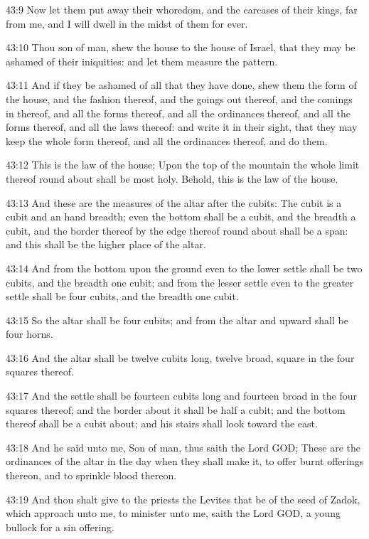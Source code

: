 43:9 Now let them put away their whoredom, and the carcases of their
kings, far from me, and I will dwell in the midst of them for ever.

43:10 Thou son of man, shew the house to the house of Israel, that
they may be ashamed of their iniquities: and let them measure the
pattern.

43:11 And if they be ashamed of all that they have done, shew them the
form of the house, and the fashion thereof, and the goings out
thereof, and the comings in thereof, and all the forms thereof, and
all the ordinances thereof, and all the forms thereof, and all the
laws thereof: and write it in their sight, that they may keep the
whole form thereof, and all the ordinances thereof, and do them.

43:12 This is the law of the house; Upon the top of the mountain the
whole limit thereof round about shall be most holy. Behold, this is
the law of the house.

43:13 And these are the measures of the altar after the cubits: The
cubit is a cubit and an hand breadth; even the bottom shall be a
cubit, and the breadth a cubit, and the border thereof by the edge
thereof round about shall be a span: and this shall be the higher
place of the altar.

43:14 And from the bottom upon the ground even to the lower settle
shall be two cubits, and the breadth one cubit; and from the lesser
settle even to the greater settle shall be four cubits, and the
breadth one cubit.

43:15 So the altar shall be four cubits; and from the altar and upward
shall be four horns.

43:16 And the altar shall be twelve cubits long, twelve broad, square
in the four squares thereof.

43:17 And the settle shall be fourteen cubits long and fourteen broad
in the four squares thereof; and the border about it shall be half a
cubit; and the bottom thereof shall be a cubit about; and his stairs
shall look toward the east.

43:18 And he said unto me, Son of man, thus saith the Lord GOD; These
are the ordinances of the altar in the day when they shall make it, to
offer burnt offerings thereon, and to sprinkle blood thereon.

43:19 And thou shalt give to the priests the Levites that be of the
seed of Zadok, which approach unto me, to minister unto me, saith the
Lord GOD, a young bullock for a sin offering.

